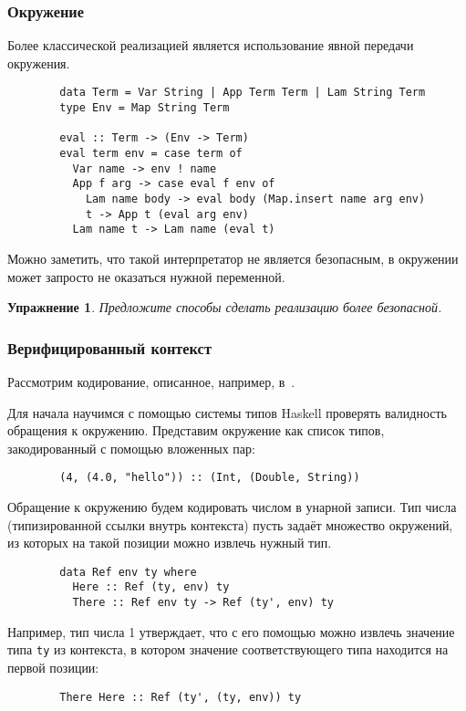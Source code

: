 \documentclass[12pt]{article}
\newtheorem{task}{Упражнение}
\begin{document}
    \subsubsection{Окружение}

    Более классической реализацией является использование явной передачи окружения.

    \begin{verbatim}
        data Term = Var String | App Term Term | Lam String Term
        type Env = Map String Term

        eval :: Term -> (Env -> Term)
        eval term env = case term of
          Var name -> env ! name
          App f arg -> case eval f env of
            Lam name body -> eval body (Map.insert name arg env)
            t -> App t (eval arg env)
          Lam name t -> Lam name (eval t)
    \end{verbatim}

    Можно заметить, что такой интерпретатор не является безопасным, в окружении может запросто не оказаться нужной переменной.

    \begin{task}
        Предложите способы сделать реализацию более безопасной.
    \end{task}

    \subsubsection{Верифицированный контекст}

    Рассмотрим кодирование, описанное, например, в~\cite{kiselyov2012typed}.

    Для начала научимся с помощью системы типов Haskell проверять валидность обращения к окружению.
    Представим окружение как список типов, закодированный с помощью вложенных пар:
    \begin{verbatim}
        (4, (4.0, "hello")) :: (Int, (Double, String))
    \end{verbatim}

    Обращение к окружению будем кодировать числом в унарной записи.
    Тип числа (типизированной ссылки внутрь контекста) пусть задаёт множество окружений, из которых на такой позиции можно извлечь нужный тип.
    \begin{verbatim}
        data Ref env ty where
          Here :: Ref (ty, env) ty
          There :: Ref env ty -> Ref (ty', env) ty
    \end{verbatim}
    Например, тип числа 1 утверждает, что с его помощью можно извлечь значение типа \texttt{ty} из контекста, в котором значение соответствующего типа находится на первой позиции:
    \begin{verbatim}
        There Here :: Ref (ty', (ty, env)) ty
    \end{verbatim}
\end{document}
